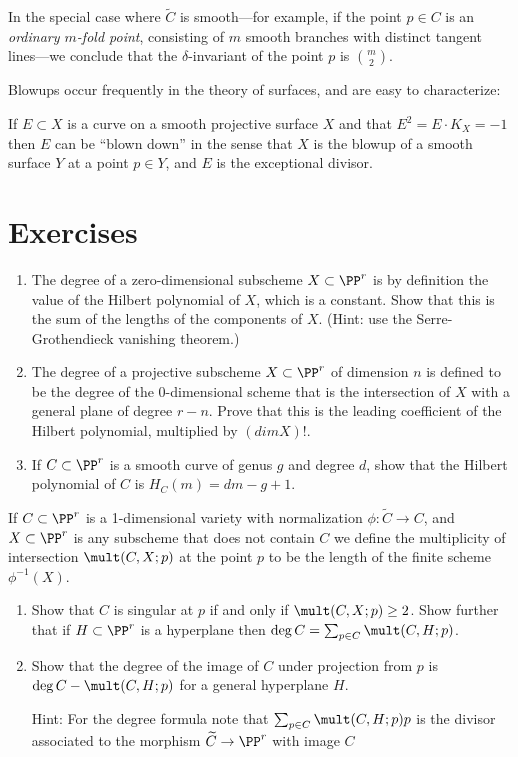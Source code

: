 In the special case where $\tilde C$ is smooth---for example, if the point $p \in C$ is an \emph{ordinary $m$-fold point}, consisting of $m$ smooth branches with distinct tangent lines---we conclude that the $\delta$-invariant of the point $p$ is $\binom{m}{2}$.


Blowups occur frequently in the theory of surfaces, and are easy to characterize:
\begin{theorem}
If $E\subset X$ is a curve on a smooth projective surface $X$ and
 that $E^2 = E\cdot K_X = -1$ then $E$ can be ``blown down'' in the sense that
 $X$ is the blowup of a smooth surface $Y$ at a point $p\in Y$, and $E$ is the exceptional divisor.
\end{theorem}


\section{Exercises}


\begin{exercise}\label{characterization of degree}
\begin{enumerate}
\item The degree of a zero-dimensional subscheme $X\subset \PP^r$ is by definition the value of the Hilbert polynomial of $X$, which is a constant. Show that
this is the sum of the lengths of the components of $X$. (Hint: use the Serre-Grothendieck vanishing theorem.)

\item The degree of a projective subscheme $X\subset \PP^r$ of dimension $n$ is defined to be the degree of the $0$-dimensional scheme
that is the intersection of $X$ with a general plane of degree $r-n$. Prove that this is the leading coefficient of the Hilbert polynomial, multiplied
by $(dim X)!$.

\item If $C\subset \PP^r$ is a smooth curve of genus $g$ and degree $d$, show that the Hilbert polynomial of $C$ is $H_C(m) = dm-g+1$.
\end{enumerate}
\end{exercise}

\begin{exercise}
If $C\subset \PP^r$ is a 1-dimensional variety with normalization $\phi: \widetilde C\to C$, and $X\subset \PP^r$ is any subscheme that does
not contain $C$
we define the multiplicity of intersection $\mult(C,X;p)$ at the point $p$ to be the length of the finite scheme $\phi^{-1}(X)$.
\begin{enumerate}
\item Show that $C$ is singular at $p$ if and only if $\mult(C,X;p) \geq 2$. Show further that if $H\subset \PP^r$ 
is a hyperplane then
 $\deg C = \sum_{p\in C} \mult(C,H;p)$. 
 \item Show that the degree of the image of $C$ under projection from $p$
 is $\deg C - \mult(C,H;p)$ for a general hyperplane $H$.
 
Hint: For the degree formula note that $\sum_{p\in C} \mult(C,H;p) p$ is the divisor associated to the morphism $\widetilde C \to \PP^r$ with image $C$
\end{enumerate}

\end{exercise}

